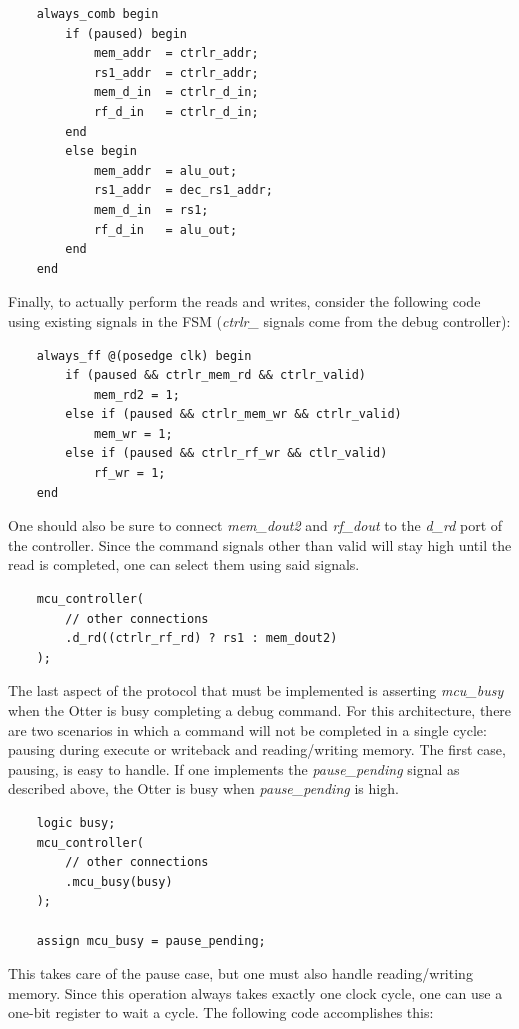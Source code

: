 \documentclass[10pt,a4paper]{article}
\begin{document}
\begin{verbatim}
    always_comb begin
        if (paused) begin
            mem_addr  = ctrlr_addr;
            rs1_addr  = ctrlr_addr;
            mem_d_in  = ctrlr_d_in;
            rf_d_in   = ctrlr_d_in;
        end
        else begin
            mem_addr  = alu_out;
            rs1_addr  = dec_rs1_addr;
            mem_d_in  = rs1;
            rf_d_in   = alu_out;
        end
    end
\end{verbatim}

Finally, to actually perform the reads and writes, consider the following code using existing
signals in the FSM (\emph{ctrlr\_} signals come from the debug controller):

\begin{verbatim}
    always_ff @(posedge clk) begin
        if (paused && ctrlr_mem_rd && ctrlr_valid)
            mem_rd2 = 1;
        else if (paused && ctrlr_mem_wr && ctrlr_valid)
            mem_wr = 1;
        else if (paused && ctrlr_rf_wr && ctlr_valid)
            rf_wr = 1;
    end
\end{verbatim}

One should also be sure to connect \emph{mem\_dout2} and \emph{rf\_dout} to the \emph{d\_rd} port of
the controller. Since the command signals other than valid will stay high until the read is
completed, one can select them using said signals.

\begin{verbatim}
    mcu_controller(
        // other connections
        .d_rd((ctrlr_rf_rd) ? rs1 : mem_dout2)
    );
\end{verbatim}

The last aspect of the protocol that must be implemented is asserting \emph{mcu\_busy} when the
Otter is busy completing a debug command. For this architecture, there are two scenarios in which a
command will not be completed in a single cycle: pausing during execute or writeback and
reading/writing memory. The first case, pausing, is easy to handle. If one implements the \emph{pause\_pending}
signal as described above, the Otter is busy when \emph{pause\_pending} is high.

\begin{verbatim}
    logic busy;
    mcu_controller(
        // other connections
        .mcu_busy(busy)
    );

    assign mcu_busy = pause_pending;
\end{verbatim}

This takes care of the pause case, but one must also handle reading/writing memory. Since this operation
always takes exactly one clock cycle, one can use a one-bit register to wait a cycle. The following
code accomplishes this:
\end{document}
